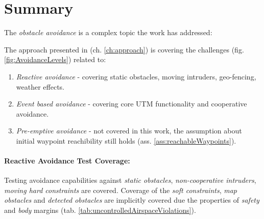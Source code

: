 \section{Summary}\label{s:conclusionSummary}
\noindent The \emph{obstacle avoidance} is a complex topic the work has addressed:


\noindent The approach presented in (ch. \ref{ch:approach}) is covering the challenges (fig. \ref{fig:AvoidanceLevels}) related to:
\begin{enumerate}
    \item \emph{Reactive avoidance} - covering static obstacles, moving intruders, geo-fencing, weather effects.
    
    \item \emph{Event based avoidance} - covering core UTM functionality and cooperative avoidance.
    
    \item \emph{Pre-emptive avoidance} - not covered in this work, the assumption about initial waypoint reachibility still holds (ass. \ref{ass:reachableWaypoints}).
\end{enumerate}

\paragraph{Reactive Avoidance Test Coverage:} Testing avoidance capabilities against \emph{static obstacles}, \emph{non-cooperative intruders}, \emph{moving hard constraints} are covered. Coverage of the \emph{soft constraints}, \emph{map obstacles} and \emph{detected obstacles} are implicitly covered due the properties of \emph{safety} and \emph{body} margins (tab. \ref{tab:uncontrolledAirspaceViolations}).
    
